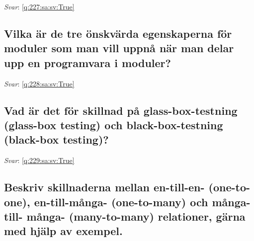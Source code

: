 \documentclass[a4paper,11pt,oneside]{article}
\begin{document}
\begin{sloppypar}
\vspace{2cm}

\noindent\makebox[\textwidth]{\hrulefill}

\vspace{1cm}

\textit{Svar}: \autoref{q:227:sa:sv:True}



\subsection{Vilka \"ar de tre \"onskv\"arda egenskaperna f\"or moduler som man vill uppn\r{a} n\"ar man delar upp en programvara i moduler?}

\label{q:228:sa:sv:False}

\vspace{2cm}

\noindent\makebox[\textwidth]{\hrulefill}

\vspace{1cm}

\textit{Svar}: \autoref{q:228:sa:sv:True}



\subsection{Vad \"ar det f\"or skillnad p\r{a} glass-box-testning (glass-box testing) och black-box-testning (black-box testing)?}

\label{q:229:sa:sv:False}

\vspace{2cm}

\noindent\makebox[\textwidth]{\hrulefill}

\vspace{1cm}

\textit{Svar}: \autoref{q:229:sa:sv:True}



\subsection{Beskriv skillnaderna mellan en-till-en- (one-to-one), en-till-m\r{a}nga- (one-to-many) och m\r{a}nga-till- m\r{a}nga- (many-to-many) relationer, g\"arna med hj\"alp av exempel.}

\label{q:230:sa:sv:False}

\vspace{2cm}

\noindent\makebox[\textwidth]{\hrulefill}


\end{sloppypar}
\end{document}
